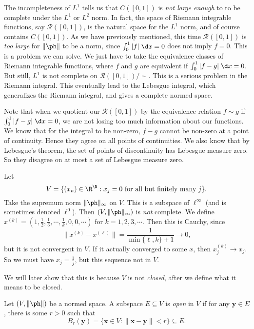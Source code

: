 \documentclass[a4paper]{article}
\begin{document}
The incompleteness of $L^1$ tells us that $C([0, 1])$ is \emph{not large enough} to to be complete under the $L^1$ or $L^2$ norm. In fact, the space of Riemann integrable functions, say $\mathcal{R}([0, 1])$, is the natural space for the $L^1$ norm, and of course contains $C([0, 1])$. As we have previously mentioned, this time $\mathcal{R}([0, 1])$ is \emph{too large} for $\|\ph\|$ to be a norm, since $\int_0^1 |f|\;\d x = 0$ does not imply $f = 0$. This is a problem we can solve. We just have to take the equivalence classes of Riemann integrable functions, where $f$ and $g$ are equivalent if $\int_0^1 |f - g|\;\d x = 0$. But still, $L^1$ is not complete on $\mathcal{R}([0, 1])/{\sim}$. This is a serious problem in the Riemann integral. This eventually lead to the Lebesgue integral, which generalizes the Riemann integral, and gives a complete normed space.

Note that when we quotient our $\mathcal{R}([0, 1])$ by the equivalence relation $f\sim g$ if $\int_0^1 |f - g|\;\d x = 0$, we are not losing too much information about our functions. We know that for the integral to be non-zero, $f - g$ cannot be non-zero at a point of continuity. Hence they agree on all points of continuities. We also know that by Lebesgue's theorem, the set of points of discontinuity has Lebesgue measure zero. So they disagree on at most a set of Lebesgue measure zero.

\begin{eg}
  Let
  \[
    V = \{(x_n) \in \R^\N: x_j = 0\text{ for all but finitely many }j\}.
  \]
  Take the supremum norm $\|\ph\|_\infty$ on $V$. This is a subspace of $\ell^\infty$ (and is sometimes denoted $\ell^0$). Then $(V, \|\ph\|_\infty)$ is \emph{not} complete. We define $x^{(k)} = (1, \frac{1}{2}, \frac{1}{3}, \cdots, \frac{1}{k}, 0, 0, \cdots)$ for $k = 1, 2, 3, \cdots$. Then this is Cauchy, since
  \[
    \|x^{(k)} - x^{(\ell)}\| = \frac{1}{\min\{\ell, k\} + 1} \to 0,
  \]
  but it is not convergent in $V$. If it actually converged to some $x$, then $x^{(k)}_j \to x_j$. So we must have $x_j = \frac{1}{j}$, but this sequence not in $V$.

  We will later show that this is because $V$ is not \emph{closed}, after we define what it means to be closed.
\end{eg}

\begin{defi}
  Let $(V, \|\ph\|)$ be a normed space. A subspace $E\subseteq V$ is \emph{open} in $V$ if for any $\mathbf{y} \in E$, there is some $r > 0$ such that
  \[
    B_r(\mathbf{y}) = \{\mathbf{x}\in V: \|\mathbf{x} - \mathbf{y}\| < r\} \subseteq E.
  \]
\end{defi}
\end{document}
